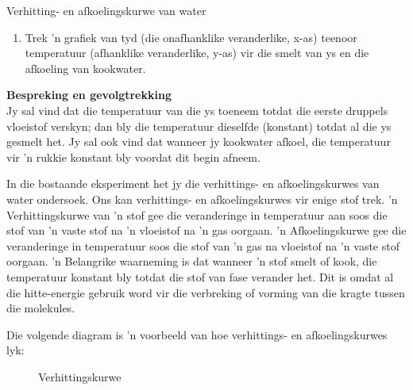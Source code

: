 \begin{f_experiment}{Verhitting- en afkoelingskurwe van water}
{\begin{enumerate}[noitemsep, label=\textbf{\arabic*}.]
\begin{table}[H]
\begin{center}
\begin{tabular}{|l|l|l|l|}
    \end{tabular}
      \end{center}
\end{table}
\item Trek 'n grafiek van tyd (die onafhanklike veranderlike, x-as) teenoor temperatuur (afhanklike veranderlike, y-as) vir die smelt van ys en die afkoeling van kookwater.
\end{enumerate}
\par   
\label{m38736*eip-864}\noindent{}\textbf{Bespreking en gevolgtrekking}\\
Jy sal vind dat die temperatuur van die ys toeneem totdat die eerste druppels vloeistof
verskyn; dan bly die temperatuur dieselfde (konstant) totdat al die ys gesmelt het. Jy sal ook
vind dat wanneer jy kookwater afkoel, die temperatuur vir 'n rukkie konstant bly voordat dit
begin afneem.}
\end{f_experiment} 
\par \label{m38736*eip-25}In die bostaande eksperiment het jy die verhittings- en afkoelingskurwes van water ondersoek. Ons kan
verhittings- en afkoelingskurwes vir enige stof trek. 'n Verhittingskurwe van 'n stof gee die veranderinge
in temperatuur aan soos die stof van 'n vaste stof na 'n vloeistof na 'n gas oorgaan. 'n Afkoelingskurwe gee
die veranderinge in temperatuur soos die stof van  'n gas na vloeistof na 'n vaste stof oorgaan. 'n Belangrike
waarneming is dat wanneer 'n stof smelt of kook, die temperatuur konstant bly totdat die stof van fase verander
het. Dit is omdat al die hitte-energie gebruik word vir die verbreking of vorming van die kragte tussen die molekules.  \par 
Die volgende diagram is 'n voorbeeld van hoe verhittings- en afkoelingskurwes lyk: \par
\begin{minipage}{0.5\textwidth}
\begin{figure}[H]
 \begin{center}
\end{center}
\caption{Verhittingskurwe}
\end{figure}
\end{minipage}
